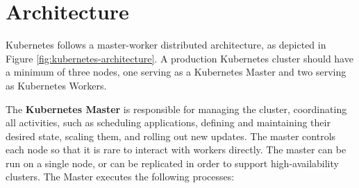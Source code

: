 \section{Architecture}
\label{sec:kubernetes-architecture}

Kubernetes follows a master-worker distributed architecture, as depicted in Figure \ref{fig:kubernetes-architecture}.
%
A production Kubernetes cluster should have a minimum of three nodes, one serving as a Kubernetes Master and two serving as Kubernetes Workers.

The \textbf{Kubernetes Master} is responsible for managing the cluster, coordinating all activities, such as scheduling applications, defining and maintaining their desired state, scaling them, and rolling out new updates.
%
The master controls each node so that it is rare to interact with workers directly.
%
The master can be run on a single node, or can be replicated in order to support high-availability clusters.
%
The Master executes the following processes:
%
